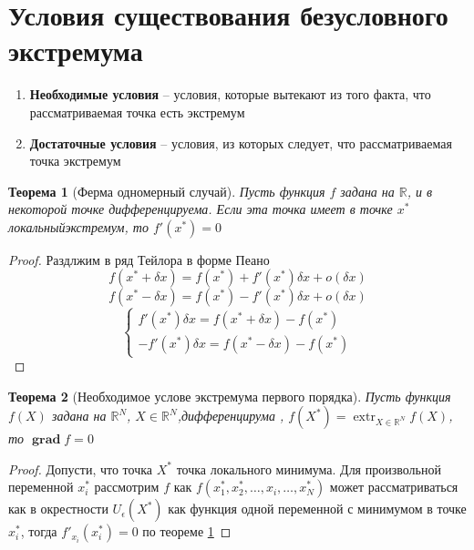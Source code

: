 \documentclass[14pt]{extarticle}
\newtheorem{theorem}{Теорема}
\DeclareMathOperator{\extr}{extr}
\DeclareMathOperator{\grad}{\textbf{grad}}
\begin{document}
	\section{Условия существования безусловного экстремума}
	\begin{enumerate}
		\item \textbf{Необходимые условия} --
			условия, которые вытекают из того факта, 
			что рассматриваемая точка есть экстремум
		\item \textbf{ Достаточные условия } --
			условия, из которых следует, что рассматриваемая точка экстремум
	\end{enumerate}
	\begin{theorem}[Ферма одномерный случай]
		\label{ferm}
		Пусть функция $f$ задана на
		 $\mathbb{R}$, и в некоторой точке
		 дифференцируема.
		 Если эта точка имеет в точке $x^{*}$ локальныйэкстремум,
		 то $f'(x^{*}) = 0$
	\end{theorem}
	\begin{proof}
		Раздлжим в ряд Тейлора в форме Пеано
		\begin{equation}
			f(x^{*} + \delta x) = f(x^{*}) + f'(x^{*}) \delta x + o(\delta x)
		\end{equation}
		\begin{equation}
			f(x^{*} - \delta x) = f(x^{*}) - f'(x^{*}) \delta x + o(\delta x)
		\end{equation}
		\begin{equation}
			\begin{cases}
			f'(x^{*}) \delta x = f(x^{*} + \delta x ) - f(x^{*})\\
				-f'(x^{*}) \delta x = f(x^{*} - \delta x) - f(x^{*})
			\end{cases}
		\end{equation}
	\end{proof}
	\begin{theorem}[Необходимое услове экстремума первого порядка]
	Пусть функция $f(X)$ задана на  $\mathbb{R}^{N}$, $X \in \mathbb{R}^{N}$,дифференцирума , $f(X^{*}) = \extr_{X \in \mathbb{R}^{N}} f(X)$, то $\grad f = 0$
	\end{theorem}
	\begin{proof}
		Допусти, что точка $X^{*}$ точка локального минимума.
		Для произвольной переменной $x^{*}_{i}$ рассмотрим
		$f$ как  $f(x_1^{*},x_2^{*},\dots,x_{i},\dots,x^{*}_{N})$ может рассматриваться как в окрестности $U_{\epsilon}(X^{*})$
		 как функция одной переменной с минимумом в точке
		 $x^{*}_{i}$, тогда $f'_{x_{i}}(x^{*}_{i}) = 0$ по
		 теореме \ref{ferm}
	\end{proof}
\end{document}
